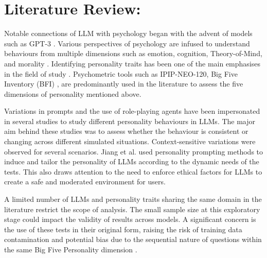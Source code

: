 \section{Literature Review: }
Notable connections of LLM with psychology began with the advent of models such as GPT-3 \cite{miotto-etal-2022-gpt}. Various perspectives of psychology are infused to understand behaviours from multiple dimensions such as emotion, cognition\cite{probingpnas}, Theory-of-Mind, and morality \cite{li2024quantifying}. Identifying personality traits has been one of the main emphasises in the field of study \cite{sorokovikova2024llmssimulatebigpersonality, probingpnas, jiang2023evaluating, serapiogarcía2023personalitytraitslargelanguage, personallm}. Psychometric tools such as IPIP-NEO-120\cite{serapiogarcía2023personalitytraitslargelanguage}, Big Five Inventory (BFI) \cite{thebfi,li2024quantifying}, are predominantly used in the literature to assess the five dimensions of personality mentioned above.

Variations in prompts and the use of role-playing agents have been impersonated in several studies to study different personality behaviours in LLMs\cite{miotto-etal-2022-gpt}. The major aim behind these studies was to assess whether the behaviour is consistent or changing across different simulated situations. Context-sensitive variations were observed for several scenarios\cite{miotto-etal-2022-gpt, jiang2023evaluating}. Jiang et al. \cite{personallm} used personality prompting methods to induce and tailor the personality of LLMs according to the dynamic needs of the tests. This also draws attention to the need to enforce ethical factors for LLMs to create a safe and moderated environment for users. 

A limited number of LLMs and personality traits sharing the same domain in the literature restrict the scope of analysis. The small sample size at this exploratory stage could impact the validity of results across models. A significant concern is the use of these tests in their original form, raising the risk of training data contamination and potential bias due to the sequential nature of questions within the same Big Five Personality dimension \cite{hagendorff2024machinepsychology}.

